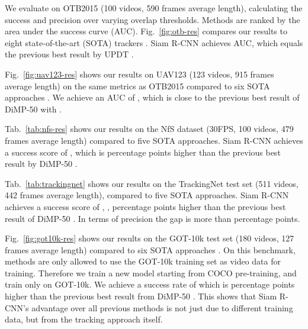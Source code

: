 \documentclass[10pt,twocolumn,letterpaper]{article}
\newcommand{\PAR}[1]{\vskip1pt \noindent {\bf #1~}}
\begin{document}
\PAR{OTB2015.} We evaluate on OTB2015 \cite{Wu15TPAMI} (100 videos, 590 frames average length), calculating the success and precision over varying overlap thresholds. Methods are ranked by the area under the success curve (AUC). Fig.~\ref{fig:otb-res} compares our results to eight state-of-the-art (SOTA) trackers \cite{Bhat18ECCV, Li19CVPR, Danelljan17CVPR, Bhat19ICCV, mdnet, Danelljan16ECCV, Danelljan19CVPR, Zhu18ECCV}.
Siam R-CNN achieves  AUC, which equals the previous best result by UPDT \cite{Bhat18ECCV}.

\PAR{UAV123.} Fig.~\ref{fig:uav123-res} shows our results on UAV123 \cite{Mueller16ECCV} (123 videos, 915 frames average length) on the same metrics as OTB2015 compared to six SOTA approaches \cite{Bhat19ICCV, Danelljan19CVPR, Li19CVPR, Zhu18ECCV, Bhat18ECCV, Danelljan17CVPR}. We achieve an AUC of , which is close to the previous best result of DiMP-50 \cite{Bhat19ICCV} with .

\PAR{NfS.} Tab.~\ref{tab:nfs-res} shows our results on the NfS dataset \cite{Galoogahi17ICCV} (30FPS, 100 videos, 479 frames average length) compared to five SOTA approaches. Siam R-CNN achieves a success score of , which is  percentage points higher than the previous best result by DiMP-50 \cite{Bhat19ICCV}.

\PAR{TrackingNet.}
Tab.~\ref{tab:trackingnet} shows our results on the TrackingNet test set \cite{Muller18ECCV} (511 videos, 442 frames average length), compared to five SOTA approaches. Siam R-CNN achieves a success score of , \ie,  percentage points higher than the previous best result of DiMP-50 \cite{Bhat19ICCV}. In terms of precision the gap is more than  percentage points.

\PAR{GOT-10k.} Fig.~\ref{fig:got10k-res} shows our results on the GOT-10k \cite{Huang18Arxiv} test set (180 videos, 127 frames average length) compared to six SOTA approaches \cite{Bhat19ICCV, zheng2019learning, Danelljan19CVPR, wang2019spm, Li19CVPR, Danelljan17CVPR}.
On this benchmark, methods are only allowed to use the GOT-10k training set as video data for training. Therefore we train a new model starting from COCO pre-training, and train only on GOT-10k. We achieve a success rate of  which is  percentage points higher than the previous best result from DiMP-50 \cite{Bhat19ICCV}. This shows that Siam R-CNN's advantage over all previous methods is not just due to different training data, but from the tracking approach itself.
\end{document}
